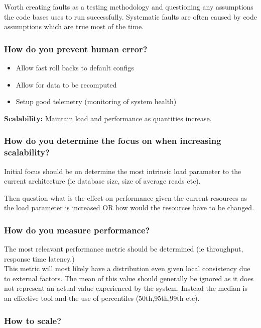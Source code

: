 \documentclass[11pt]{scrartcl} %
\begin{document}
Worth creating faults as a testing methodology and questioning any assumptions the code bases uses to
run successfully. Systematic faults are often caused by code assumptions which are true most of the 
time. 

\subsubsection{How do you prevent human error?}

\begin{itemize}
	\item Allow fast roll backs to default configs
	\item Allow for data to be recomputed
	\item Setup good telemetry (monitoring of system health)
\end{itemize}

\textbf{Scalability:} Maintain load and performance as quantities increase.\\

\subsubsection{How do you determine the focus on when increasing scalability?}

Initial focus should be on determine the most intrinsic load parameter to the current architecture 
(ie database size, size of average reads etc).

Then question what is the effect on performance given the current resources as the load parameter is increased OR
how would the resources have to be changed.

\subsubsection{How do you measure performance?}

The most releavant performance metric should be determined (ie throughput, response time latency.) \\

This metric will most likely have a distribution even given local consistency due to external factors. The mean of this
value should generally be ignored as it does not represent an actual value experienced by the system. Instead the
median is an effective tool and the use of percentiles (50th,95th,99th etc).

\subsubsection{How to scale?}
\end{document}
